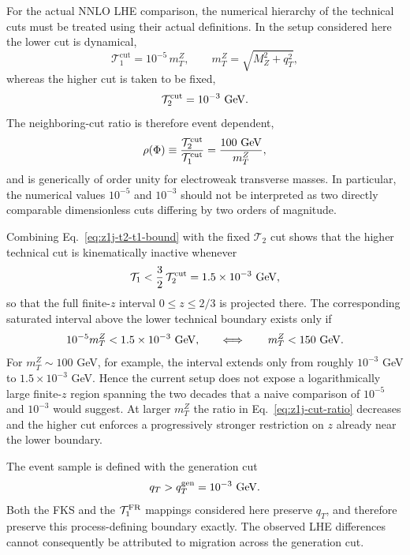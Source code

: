\documentclass[11pt]{article}
\newcommand{\cut}{\mathrm{cut}}
\newcommand{\Ph}{\Phi}
\begin{document}
For the actual NNLO LHE comparison, the numerical hierarchy of the technical cuts must be treated using their
actual definitions. In the
setup considered here the lower cut is dynamical,
\begin{equation}
\mathcal T_1^{\cut}
=10^{-5}\,m_T^Z,
\qquad
m_T^Z=\sqrt{M_Z^2+q_T^2},
\label{eq:z1j-dynamic-t1cut}
\end{equation}
whereas the higher cut is taken to be fixed,
\begin{equation}
\mathcal T_2^{\cut}=10^{-3}\ {\rm GeV}.
\label{eq:z1j-fixed-t2cut}
\end{equation}
The neighboring-cut ratio is therefore event dependent,
\begin{equation}
\rho(\Ph)
\equiv
\frac{\mathcal T_2^{\cut}}{\mathcal T_1^{\cut}}
=
\frac{100\ {\rm GeV}}{m_T^Z},
\label{eq:z1j-cut-ratio}
\end{equation}
and is generically of order unity for electroweak transverse masses. In particular, the numerical values
$10^{-5}$ and $10^{-3}$ should not be interpreted as two directly comparable dimensionless cuts differing
by two orders of magnitude.

Combining Eq.~\eqref{eq:z1j-t2-t1-bound} with the fixed $\mathcal T_2$ cut shows that the higher technical cut
is kinematically inactive whenever
\begin{equation}
\mathcal T_1
<
\frac32\,\mathcal T_2^{\cut}
=
1.5\times10^{-3}\ {\rm GeV},
\label{eq:z1j-t2cut-inactive}
\end{equation}
so that the full finite-$z$ interval $0\le z\le2/3$ is projected there. The corresponding saturated interval
above the lower technical boundary exists only if
\begin{equation}
10^{-5}m_T^Z
<1.5\times10^{-3}\ {\rm GeV},
\qquad\Longleftrightarrow\qquad
m_T^Z<150\ {\rm GeV}.
\label{eq:z1j-saturated-condition}
\end{equation}
For $m_T^Z\sim100$ GeV, for example, the interval extends only from roughly
$10^{-3}$ GeV to $1.5\times10^{-3}$ GeV. Hence the current setup does not expose a logarithmically large
finite-$z$ region spanning the two decades that a naive comparison of $10^{-5}$ and $10^{-3}$ would suggest.
At larger $m_T^Z$ the ratio in Eq.~\eqref{eq:z1j-cut-ratio} decreases and the higher cut enforces a progressively
stronger restriction on $z$ already near the lower boundary.

The event sample is defined with the generation cut
\begin{equation}
q_T>q_T^{\rm gen}=10^{-3}\ {\rm GeV}.
\label{eq:z1j-generation-cut}
\end{equation}
Both the FKS and the $\mathcal T_1^{\rm FR}$ mappings considered here preserve $q_T$, and therefore preserve
this process-defining boundary exactly. The observed LHE differences cannot consequently be attributed to
migration across the generation cut.
\end{document}
